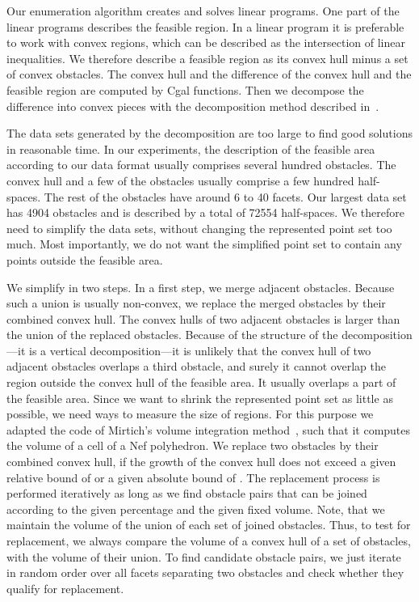 \documentclass{article}
\newcounter{algo}
\newcommand{\cgal}{{\sc Cgal}}
\begin{document}
Our enumeration algorithm creates and solves linear programs. One part
of the linear programs describes the feasible region. In a linear
program it is preferable to work with convex regions, which can be
described as the intersection of linear inequalities. We therefore
describe a feasible region as its convex hull minus a set of convex
obstacles. The convex hull and the difference of the convex hull and
the feasible region are computed by {\cgal} functions. Then we
decompose the difference into convex pieces with the decomposition
method described in~\cite{h-emspe-07}.

The data sets generated by the decomposition are too large to find
good solutions in reasonable time. In our experiments, the description
of the feasible area according to our data format usually comprises
several hundred obstacles. The convex hull and a few of the obstacles
usually comprise a few hundred half-spaces. The rest of the obstacles
have around 6 to 40 facets. Our largest data set has 4904 obstacles
and is described by a total of 72554 half-spaces. We therefore need to
simplify the data sets, without changing the represented point set too
much. Most importantly, we do not want the simplified point set to
contain any points outside the feasible area.

We simplify in two steps. In a first step, we merge adjacent
obstacles. Because such a union is usually non-convex, we replace the
merged obstacles by their combined convex hull. The convex hulls of
two adjacent obstacles is larger than the union of the replaced
obstacles. Because of the structure of the decomposition---it is a
vertical decomposition---it is unlikely that the convex hull of two
adjacent obstacles overlaps a third obstacle, and surely it cannot
overlap the region outside the convex hull of the feasible area. It
usually overlaps a part of the feasible area. Since we want to shrink
the represented point set as little as possible, we need ways to measure
the size of regions. For this purpose we adapted the code of Mirtich's
volume integration method~\cite{m-facpm-96}, such that it computes the
volume of a cell of a Nef polyhedron. We replace two obstacles by
their combined convex hull, if the growth of the convex hull does not
exceed a given relative bound of  or a given absolute bound of
. The replacement process is performed iteratively as long as
we find obstacle pairs that can be joined according to the given
percentage and the given fixed volume. Note, that we maintain the
volume of the union of each set of joined obstacles. Thus, to test for
replacement, we always compare the volume of a convex hull of a set of
obstacles, with the volume of their union. To find candidate obstacle
pairs, we just iterate in random order over all facets separating two
obstacles and check whether they qualify for replacement.
\end{document}
